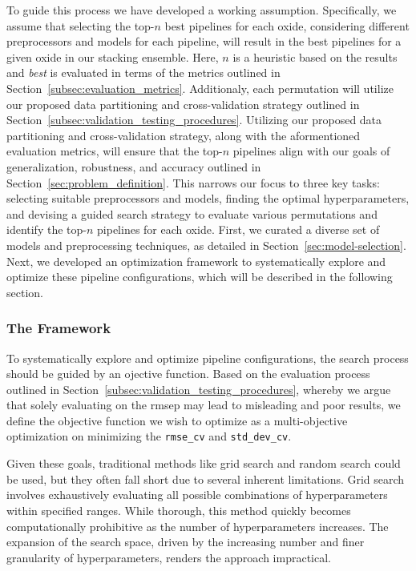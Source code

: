 To guide this process we have developed a working assumption.
Specifically, we assume that selecting the top-$n$ best pipelines for each oxide, considering different preprocessors and models for each pipeline, will result in the best pipelines for a given oxide in our stacking ensemble.
Here, $n$ is a heuristic based on the results and \textit{best} is evaluated in terms of the metrics outlined in Section~\ref{subsec:evaluation_metrics}.
Additionaly, each permutation will utilize our proposed data partitioning and cross-validation strategy outlined in Section~\ref{subsec:validation_testing_procedures}.
Utilizing our proposed data partitioning and cross-validation strategy, along with the aformentioned evaluation metrics, will ensure that the top-$n$ pipelines align with our goals of generalization, robustness, and accuracy outlined in Section~\ref{sec:problem_definition}.
This narrows our focus to three key tasks: selecting suitable preprocessors and models, finding the optimal hyperparameters, and devising a guided search strategy to evaluate various permutations and identify the top-$n$ pipelines for each oxide.
First, we curated a diverse set of models and preprocessing techniques, as detailed in Section~\ref{sec:model-selection}.
Next, we developed an optimization framework to systematically explore and optimize these pipeline configurations, which will be described in the following section.

\subsubsection{The Framework}
To systematically explore and optimize pipeline configurations, the search process should be guided by an ojective function.
Based on the evaluation process outlined in Section~\ref{subsec:validation_testing_procedures}, whereby we argue that solely evaluating on the \gls{rmsep} may lead to misleading and poor results, we define the objective function we wish to optimize as a multi-objective optimization on minimizing the \texttt{rmse\_cv} and \texttt{std\_dev\_cv}. 

Given these goals, traditional methods like grid search and random search could be used, but they often fall short due to several inherent limitations. 
Grid search involves exhaustively evaluating all possible combinations of hyperparameters within specified ranges. 
While thorough, this method quickly becomes computationally prohibitive as the number of hyperparameters increases. The expansion of the search space, driven by the increasing number and finer granularity of hyperparameters, renders the approach impractical.

